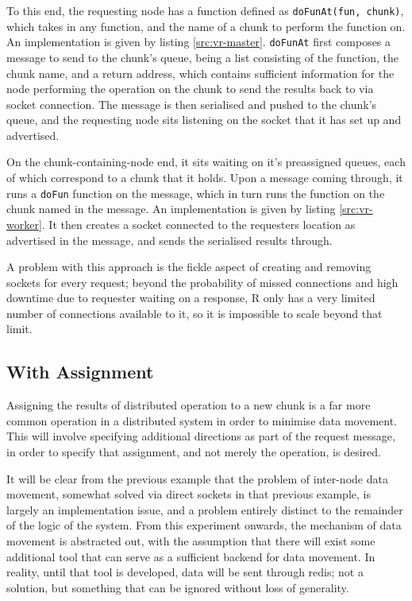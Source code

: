 \documentclass[a4paper,10pt]{article}
\begin{document}
To this end, the requesting node has a function defined as \texttt{doFunAt(fun,
chunk)}, which takes in any function, and the name of a chunk to perform the
function on.
An implementation is given by listing \ref{src:vr-master}.
\texttt{doFunAt} first composes a message to send to the chunk's queue, being a
list consisting of the function, the chunk name, and a return address, which
contains sufficient information for the node performing the operation on the
chunk to send the results back to via socket connection.
The message is then serialised and pushed to the chunk's queue, and the
requesting node sits listening on the socket that it has set up and advertised.
\newpage


On the chunk-containing-node end, it sits waiting on it's preassigned queues,
each of which correspond to a chunk that it holds. Upon a message coming
through, it runs a \texttt{doFun} function on the message, which in turn runs
the function on the chunk named in the message. 
An implementation is given by listing \ref{src:vr-worker}.
It then creates a socket connected to the requesters location as advertised in
the message, and sends the serialised results through.



A problem with this approach is the fickle aspect of creating and removing
sockets for every request; beyond the probability of missed connections and
high downtime due to requester waiting on a response, R only has a very limited
number of connections available to it, so it is impossible to scale beyond that
limit.

\subsection{With Assignment}

Assigning the results of distributed operation to a new chunk is a far more
common operation in a distributed system in order to minimise data movement.
This will involve specifying additional directions as part of the request
message, in order to specify that assignment, and not merely the operation, is
desired.

It will be clear from the previous example that the problem of inter-node data
movement, somewhat solved via direct sockets in that previous example, is
largely an implementation issue, and a problem entirely distinct to the
remainder of the logic of the system.
From this experiment onwards, the mechanism of data movement is abstracted out,
with the assumption that there will exist some additional tool that can serve
as a sufficient backend for data movement.
In reality, until that tool is developed, data will be sent through redis; not
a solution, but something that can be ignored without loss of generality.
\end{document}
